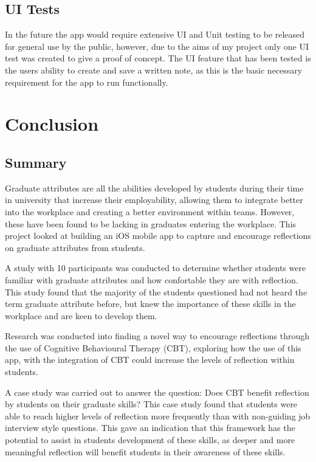 \documentclass{l4proj}
\begin{document}
\section{UI Tests}

In the future the app would require extensive UI and Unit testing to be released for general use by the public, however, due to the aims of my project only one UI test was created to give a proof of concept. The UI feature that has been tested is the users ability to create and save a written note, as this is the basic necessary requirement for the app to run functionally. 


\chapter{Conclusion}  

\section{Summary}

Graduate attributes are all the abilities developed by students during their time in university that increase their employability, allowing them to integrate better into the workplace and creating a better environment within teams. However, these have been found to be lacking in graduates entering the workplace. This project looked at building an iOS mobile app to capture and encourage reflections on graduate attributes from students. 

A study with 10 participants was conducted to determine whether students were familiar with graduate attributes and how confortable they are with reflection. This study found that the majority of the students questioned had not heard the term graduate attribute before, but knew the importance of these skills in the workplace and are keen to develop them.

Research was conducted into finding a novel way to encourage reflections through the use of Cognitive Behavioural Therapy (CBT), exploring how the use of this app, with the integration of CBT could increase the levels of reflection within students. 

A case study was carried out to answer the question: Does CBT benefit reflection by students on their graduate skills? This case study found that students were able to reach higher levels of reflection more frequently than with non-guiding job interview style questions. This gave an indication that this framework has the potential to assist in students development of these skills, as deeper and more meaningful reflection will benefit students in their awareness of these skills.
\end{document}
